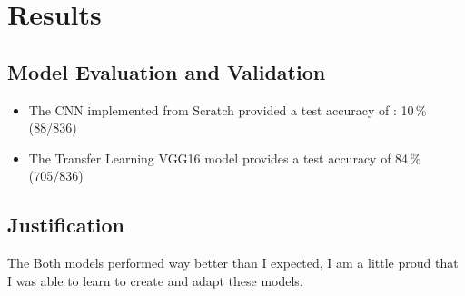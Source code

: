\documentclass[paper=A4, DIV=10, parskip=half]{scrartcl}
\begin{document}

\section*{Results}

\subsection*{Model Evaluation and Validation}

\begin{itemize}
  \item The CNN implemented from Scratch provided a test accuracy of : 10\,\%
  (88/836)
  \item The Transfer Learning VGG16 model provides a test accuracy of 84\,\% (705/836)
\end{itemize}


\subsection*{Justification}

The Both models performed way better than I expected, I am a little proud that I
was able to learn to create and adapt these models.


\end{document}
